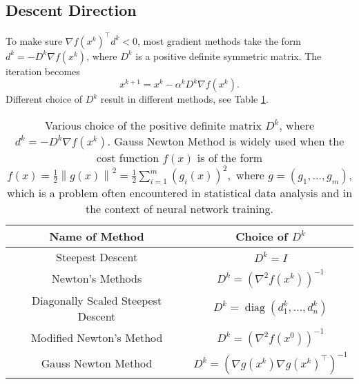 \documentclass[12pt,a4paper]{report}
\numberwithin{equation}{section}
\theoremstyle{mystyle}
\newcommand{\grad}{\nabla}
\newcommand{\T}{\top}
\newcommand{\diag}{\operatorname{diag}}
\newcommand{\norm}[1]{\left\lVert #1 \right\rVert}
\begin{document}
	\subsection{Descent Direction}
	To make sure $\grad f(x^k)^\T d^k<0$, most gradient methods take the form $d^k =-D^k \grad f(x^k)$, where $D^k$ is a positive definite symmetric matrix. The iteration becomes
	\begin{equation}
		x^{k+1} = x^k -\alpha^k D^k \grad f(x^k).
	\end{equation}
	Different choice of $D^k$ result in different methods, see Table \ref{table:descent direction}.
	\begin{table}[]
		\centering
		\begin{tabular}{@{}cc@{}}
			\toprule
			Name of Method                     & Choice of $D^k$                                                                                                                                 \\ \midrule
			Steepest Descent                   & $D^k = I$                                                                                                                                       \\
			Newton's Methods                   & $D^k=\left(\grad^2 f(x^k)\right)^{-1}$                                                                                                          \\
			Diagonally Scaled Steepest Descent & $D^k=\diag(d_1^k,\dots,d_n^k)$                                                                                                                  \\
			Modified Newton's Method           & $D^k=\left(\grad^2 f(x^0)\right)^{-1}$                                                                                                          \\
			Gauss Newton Method                & $D^k=(\grad g(x^k)\grad g(x^k)^\T)^{-1}$\\ \bottomrule
		\end{tabular}
	\caption{
		Various choice of the positive definite matrix $D^k$, where $d^k=-D^k \grad f(x^k)$. Gauss Newton Method is widely used when the cost function $f(x)$ is of the form 
		$f(x)=\frac{1}{2}\norm{g(x)}^2=\frac{1}{2}\sum_{i=1}^m (g_i(x))^2,$
		where $g=(g_1,\dots,g_m)$, which is a problem often encountered in statistical data analysis and in the context of neural network training.}
	\label{table:descent direction}
	\end{table}
	
\end{document}

